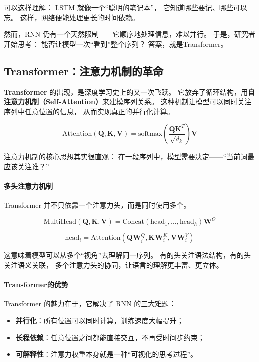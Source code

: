 可以这样理解：  
LSTM 就像一个“聪明的笔记本”，  
它知道哪些要记、哪些可以忘。  
这样，网络便能处理更长的时间依赖。

然而，RNN 仍有一个天然限制——它顺序地处理信息，难以并行。  
于是，研究者开始思考：  
能否让模型一次“看到”整个序列？  
答案，就是Transformer。

\subsection{Transformer：注意力机制的革命}

\textbf{Transformer} 的出现，是深度学习史上的又一次飞跃。  
它放弃了循环结构，用\textbf{自注意力机制（Self-Attention）}来建模序列关系。  
这种机制让模型可以同时关注序列中任意位置的信息，  
从而实现真正的并行化计算。

$$\text{Attention}(\mathbf{Q}, \mathbf{K}, \mathbf{V}) = \text{softmax}\left(\frac{\mathbf{Q}\mathbf{K}^T}{\sqrt{d_k}}\right)\mathbf{V}$$

注意力机制的核心思想其实很直观：  
在一段序列中，模型需要决定——“当前词最应该关注谁？”

\paragraph{多头注意力机制}  
Transformer 并不只依靠一个注意力头，而是同时使用多个。  

$$\text{MultiHead}(\mathbf{Q}, \mathbf{K}, \mathbf{V}) = \text{Concat}(\text{head}_1, \ldots, \text{head}_h)\mathbf{W}^O$$

$$\text{head}_i = \text{Attention}(\mathbf{Q}\mathbf{W}_i^Q, \mathbf{K}\mathbf{W}_i^K, \mathbf{V}\mathbf{W}_i^V)$$

这意味着模型可以从多个“视角”去理解同一序列。  
有的头关注语法结构，有的头关注语义关联，  
多个注意力头的协同，让语言的理解更丰富、更立体。

\paragraph{Transformer的优势}  
Transformer 的魅力在于，它解决了 RNN 的三大难题：

\begin{itemize}
\item \textbf{并行化}：所有位置可以同时计算，训练速度大幅提升；
\item \textbf{长程依赖}：任意位置之间都能直接交互，不再受时间步约束；
\item \textbf{可解释性}：注意力权重本身就是一种“可视化的思考过程”。
\end{itemize}

